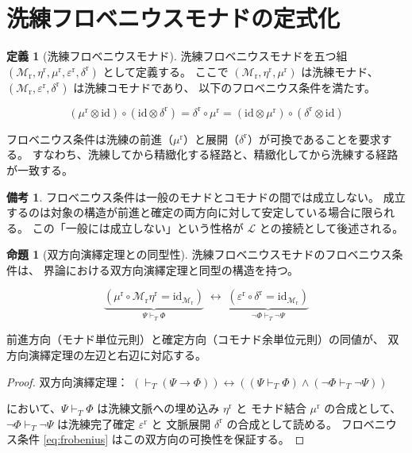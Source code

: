 \documentclass[11pt,a4paper]{article}
\theoremstyle{definition}
\newtheorem{definition}{定義}[section]
\newtheorem{proposition}{命題}[section]
\newtheorem{remark}{備考}[section]
\newcommand{\Lhagma}{\mathcal{L}}
\newcommand{\Mr}{\mathcal{M}_{\mathrm{r}}}
\newcommand{\etar}{\eta^{\mathrm{r}}}
\newcommand{\mur}{\mu^{\mathrm{r}}}
\newcommand{\epsr}{\varepsilon^{\mathrm{r}}}
\newcommand{\deltar}{\delta^{\mathrm{r}}}
\begin{document}
\section{洗練フロベニウスモナドの定式化}

\begin{definition}[洗練フロベニウスモナド]
洗練フロベニウスモナドを五つ組 $(\Mr, \etar, \mur, \epsr, \deltar)$ として定義する。
ここで $(\Mr, \etar, \mur)$ は洗練モナド、$(\Mr, \epsr, \deltar)$ は洗練コモナドであり、
以下のフロベニウス条件を満たす。

\begin{equation}
(\mur \otimes \mathrm{id}) \circ (\mathrm{id} \otimes \deltar)
= \deltar \circ \mur
= (\mathrm{id} \otimes \mur) \circ (\deltar \otimes \mathrm{id})
\label{eq:frobenius}
\end{equation}

フロベニウス条件は洗練の前進（$\mur$）と展開（$\deltar$）が可換であることを要求する。
すなわち、洗練してから精緻化する経路と、精緻化してから洗練する経路が一致する。
\end{definition}

\begin{remark}
フロベニウス条件は一般のモナドとコモナドの間では成立しない。
成立するのは対象の構造が前進と確定の両方向に対して安定している場合に限られる。
この「一般には成立しない」という性格が $\Lhagma$ との接続として後述される。
\end{remark}

\begin{proposition}[双方向演繹定理との同型性]
洗練フロベニウスモナドのフロベニウス条件は、
界論における双方向演繹定理\cite{Chiba2026_bdt}と同型の構造を持つ。

\begin{equation}
\underbrace{(\mur \circ \Mr\etar = \mathrm{id}_{\Mr})}_{\Psi \vdash_T \Phi} \;\leftrightarrow\;
\underbrace{(\epsr \circ \deltar = \mathrm{id}_{\Mr})}_{\neg\Phi \vdash_T \neg\Psi}
\end{equation}

前進方向（モナド単位元則）と確定方向（コモナド余単位元則）の同値が、
双方向演繹定理の左辺と右辺に対応する。
\end{proposition}

\begin{proof}
双方向演繹定理：
$(\vdash_T (\Psi \to \Phi)) \leftrightarrow
((\Psi \vdash_T \Phi) \land (\neg\Phi \vdash_T \neg\Psi))$

において、$\Psi \vdash_T \Phi$ は洗練文脈への埋め込み $\etar$ と
モナド結合 $\mur$ の合成として、
$\neg\Phi \vdash_T \neg\Psi$ は洗練完了確定 $\epsr$ と
文脈展開 $\deltar$ の合成として読める。
フロベニウス条件 \eqref{eq:frobenius} はこの双方向の可換性を保証する。
\end{proof}
\end{document}
